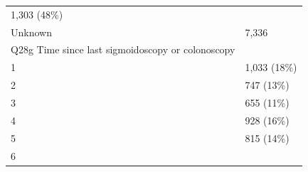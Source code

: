 \documentclass[]{article}
\begin{document}
\begin{longtable}[]{@{}ll@{}}
\begin{minipage}[t]{0.23\columnwidth}
1,303 (48\%)\strut
\end{minipage}\tabularnewline
\begin{minipage}[t]{0.71\columnwidth}\raggedright
Unknown\strut
\end{minipage} & \begin{minipage}[t]{0.23\columnwidth}\raggedright
7,336\strut
\end{minipage}\tabularnewline
\begin{minipage}[t]{0.71\columnwidth}\raggedright
Q28g Time since last sigmoidoscopy or colonoscopy\strut
\end{minipage} & \begin{minipage}[t]{0.23\columnwidth}\raggedright
\strut
\end{minipage}\tabularnewline
\begin{minipage}[t]{0.71\columnwidth}\raggedright
1\strut
\end{minipage} & \begin{minipage}[t]{0.23\columnwidth}\raggedright
1,033 (18\%)\strut
\end{minipage}\tabularnewline
\begin{minipage}[t]{0.71\columnwidth}\raggedright
2\strut
\end{minipage} & \begin{minipage}[t]{0.23\columnwidth}\raggedright
747 (13\%)\strut
\end{minipage}\tabularnewline
\begin{minipage}[t]{0.71\columnwidth}\raggedright
3\strut
\end{minipage} & \begin{minipage}[t]{0.23\columnwidth}\raggedright
655 (11\%)\strut
\end{minipage}\tabularnewline
\begin{minipage}[t]{0.71\columnwidth}\raggedright
4\strut
\end{minipage} & \begin{minipage}[t]{0.23\columnwidth}\raggedright
928 (16\%)\strut
\end{minipage}\tabularnewline
\begin{minipage}[t]{0.71\columnwidth}\raggedright
5\strut
\end{minipage} & \begin{minipage}[t]{0.23\columnwidth}\raggedright
815 (14\%)\strut
\end{minipage}\tabularnewline
\begin{minipage}[t]{0.71\columnwidth}\raggedright
6\strut
\end{minipage} & \begin{minipage}[t]{0.23\columnwidth}\raggedright

\end{minipage}
\end{longtable}
\end{document}

